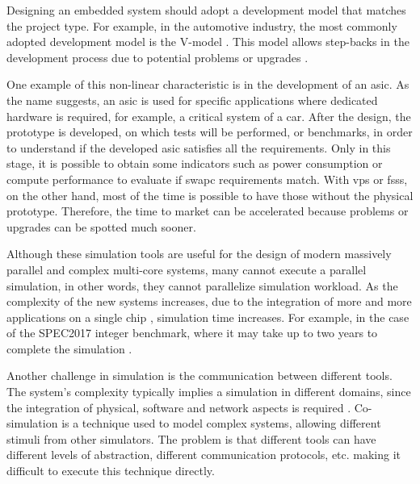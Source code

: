 


Designing an embedded system should adopt a development model that matches the project type. 
For example, in the automotive industry, the most commonly adopted development model is the V-model \cite{liu2016incremental}. This model 
allows step-backs in the development process due to potential problems or upgrades \cite{ProductDesignSteps}. 

One example of this non-linear characteristic is in the development of an \gls{asic}. As the name suggests, an \gls{asic} is used for specific 
applications where dedicated hardware is required, for example, a critical system of a car. After the design, the prototype is developed, on 
which tests will be performed, or benchmarks, in order to understand if the developed \gls{asic} satisfies all the requirements. Only in this stage, 
it is possible to obtain some indicators such as power consumption or compute performance to evaluate if \gls{swapc} requirements match. 
With \glspl{vp} or \glspl{fss}, on the other hand, most of the time is possible to have those without the physical prototype. 
Therefore, the time to market can be accelerated because problems or upgrades can be spotted much sooner.

Although these simulation tools are useful for the design of modern massively parallel and complex multi-core systems, 
many cannot execute a parallel simulation, in other words, they cannot parallelize simulation workload. 
As the complexity of the new systems increases, due to the integration of more and more applications on a single chip 
\cite{terascaleComputing}, simulation time increases.
For example, in the case of the SPEC2017 integer benchmark, where it may 
take up to two years to complete the simulation \cite{pargem5}. 

Another challenge in simulation is the communication between different tools. The system's complexity typically implies a simulation in 
different domains, since the integration of physical, software and network aspects is required \cite{gomes2017co}. Co-simulation is a technique 
used to model complex systems, allowing different stimuli from other simulators. The problem is that different tools can have different levels 
of abstraction, different communication protocols, etc. making it difficult to execute this technique directly. 

